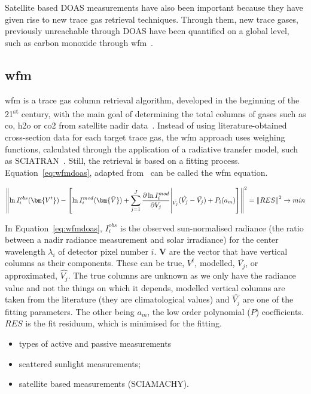 Satellite based \gls{DOAS} measurements have also been important because
they have given rise to new trace gas retrieval techniques. Through
them, new trace gases, previously unreachable through \gls{DOAS} have
been quantified on a global level, such as carbon monoxide through
\gls{wfm}~\cite{Buchwitz2000, Buchwitz2004}.

\subsection{\acrlong{wfm}}%
\label{sub:wfm_doas}

\gls{wfm} is a trace gas column retrieval algorithm, developed in the
beginning of the 21\textsuperscript{st} century, with the main goal of
determining the total columns of gases such as \gls{co}, \gls{h2o} or
\gls{co2} from satellite nadir data~\cite{Buchwitz2004}. Instead of
using literature-obtained cross-section data for each target trace gas,
the \gls{wfm} approach uses weighing functions, calculated through the
application of a radiative transfer model, such as
SCIATRAN~. Still, the retrieval is based on a
fitting process. Equation~\ref{eq:wfmdoas}, adapted
from~\cite{Buchwitz2000, Buchwitz2004} can be called the \gls{wfm}
equation.

\begin{equation}
    \centering
    \left \lVert \ln I_{i}^{obs}(\bm{V^t}) - \left[ \ln
            I_{i}^{mod}(\bm{\bar{V}}) +
        \sum_{j=1}^{J} \frac{\partial \ln I_{i}^{mod}}{\partial V_{j}}
        \middle \vert_{\bar{V_{j}}} (\hat{V_{j}} - \bar{V_{j}}) +
        P_{i}(a_m)
    \right] \right\rVert^{2} = \left \lVert RES \right \rVert^2
    \rightarrow min
    \label{eq:wfmdoas}
\end{equation}

In Equation~\ref{eq:wfmdoas}, $I_{i}^{obs}$ is the observed
sun-normalised radiance (the ratio between a nadir radiance measurement
and solar irradiance) for the center wavelength $\lambda_i$ of detector
pixel number $i$. $\bm{V}$ are the vector that have vertical columns as
their components. These can be true, $V^t$, modelled, $\bar{V_j}$, or
approximated, $\hat{V_j}$. The true columns are unknown as we only have
the radiance value and not the things on which it depends, modelled
vertical columns are taken from the literature (they are climatological
values) and $\hat{V_j}$ are one of the fitting parameters. The other
being $a_m$, the low order polynomial ($P$) coefficients. $RES$ is
the fit residuum, which is minimised for the fitting. 

\begin{itemize}
    \item types of active and passive measurements
    \item scattered sunlight measurements;
    \item satellite based measurements (SCIAMACHY).
\end{itemize}
